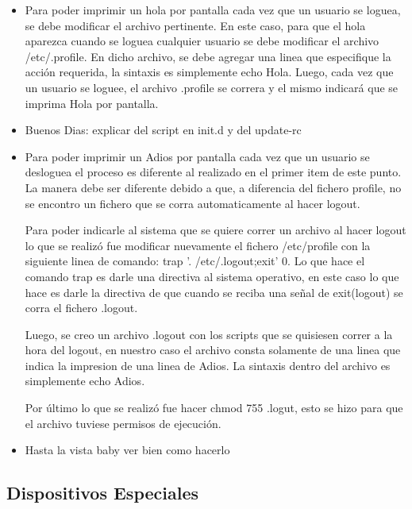 \documentclass[a4paper, 12pt]{article}
\begin{document}
\begin{itemize}
\item Para poder imprimir un hola por pantalla cada vez que un usuario se loguea, se debe modificar el archivo pertinente. En este caso, para que el hola aparezca cuando se loguea cualquier usuario se debe modificar el archivo /etc/.profile. En dicho archivo, se debe agregar una linea que especifique la acci\'on requerida, la sintaxis es simplemente echo Hola. Luego, cada vez que un usuario se loguee, el archivo .profile se correra y el mismo indicar\'a que se imprima Hola por pantalla.

\item Buenos Dias: explicar del script en init.d y del update-rc


\item Para poder imprimir un Adios por pantalla cada vez que un usuario se desloguea el proceso es diferente al realizado en el primer item de este punto. La manera debe ser diferente debido a que, a diferencia del fichero profile, no se encontro un fichero que se corra automaticamente al hacer logout. 

Para poder indicarle al sistema que se quiere correr un archivo al hacer logout lo que se realiz\'o fue modificar nuevamente el fichero /etc/profile con la siguiente linea de comando: trap '. /etc/.logout;exit' 0. Lo que hace el comando trap es darle una directiva al sistema operativo, en este caso lo que hace es darle la directiva de que cuando se reciba una se\~{n}al de exit(logout) se corra el fichero .logout.

Luego, se creo un archivo .logout con los scripts que se quisiesen correr a la hora del logout, en nuestro caso el archivo consta solamente de una linea que indica la impresion de una linea de Adios. La sintaxis dentro del archivo es simplemente echo Adios.

Por \'ultimo lo que se realiz\'o fue hacer chmod 755 .logut, esto se hizo para que el archivo tuviese permisos de ejecuci\'on.

\item Hasta la vista baby ver bien como hacerlo


\end{itemize}

\subsection*{Dispositivos Especiales}
\end{document}
